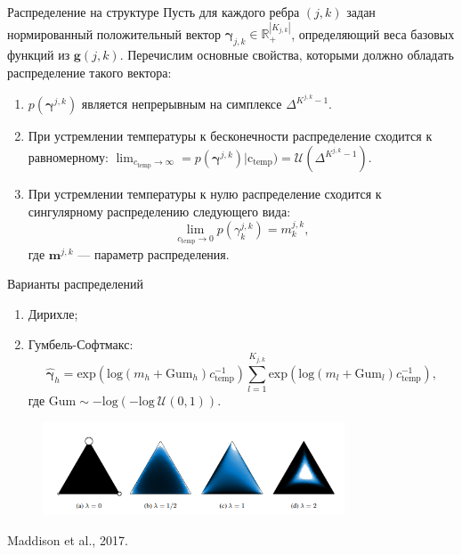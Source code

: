 \documentclass[usenames,dvipsnames,10pt,pdf,utf8,russian,aspectratio=43]{beamer}
\begin{document}
\begin{frame}{ Распределение на структуре}
Пусть для каждого ребра $(j,k)$ задан нормированный положительный вектор $\boldsymbol{\gamma}_{j,k} \in \mathbb{R}_{+}^{|K_{j,k}|}$, определяющий веса базовых функций из  $\mathbf{g}(j,k)$. Перечислим основные свойства, которыми должно обладать распределение такого вектора:
\begin{enumerate}
\item $p(\boldsymbol{\gamma}^{j,k})$ является непрерывным на симплексе $\Delta^{K^{j,k}-1}$.
\item При устремлении температуры к бесконечности распределение сходится к равномерному: $\lim_{c_{\text{temp}} \to \infty} = p(\boldsymbol{\gamma}^{j,k})| \text{c}_{\text{temp}}) = \mathcal{U}(\Delta^{K^{j,k}-1}).$
\item При устремлении температуры к нулю распределение сходится к сингулярному распределению следующего вида:
$$\lim_{c_{\text{temp}} \to 0}  p(\gamma^{j,k}_k) = m^{j,k}_k,$$ где $\mathbf{m}^{j,k}$ --- параметр распределения.
\end{enumerate}


\end{frame}


\begin{frame}{Варианты распределений}
\begin{enumerate}
\item Дирихле;
\item Гумбель-Софтмакс: 
\[
    \hat{\boldsymbol{\gamma}}_h = \text{exp}\left(\text{log}\left(m_h + \text{Gum}_h\right)c_{\text{temp}}^{-1}\right) \sum_{l=1}^{K_{j,k}} \text{exp}\left(\text{log}\left(m_l + \text{Gum}_l\right)c_{\text{temp}}^{-1}\right),
\]
где $\text{Gum} \sim -\text{log}(-\text{log}~\mathcal{U}(0,1)).$ 
\end{enumerate}

\begin{figure}
  \centering
{\includegraphics[width=0.8\textwidth]{gs.png}} 
\end{figure}

Maddison et al., 2017.
\end{frame}
\end{document}
